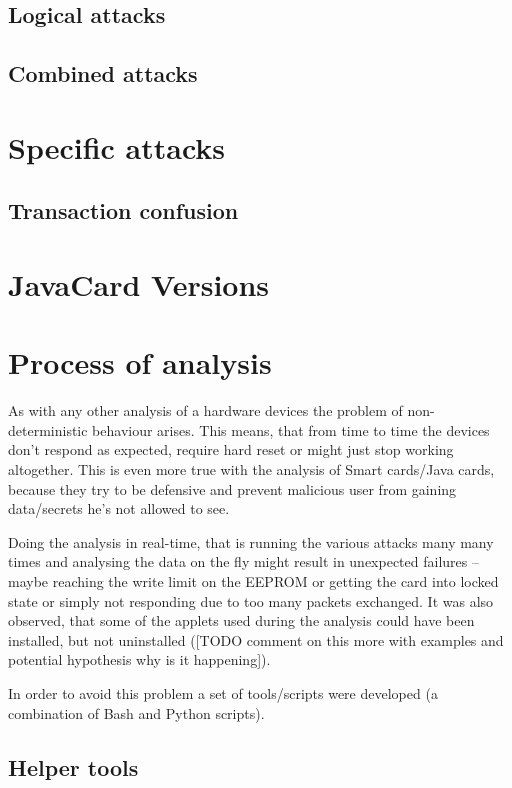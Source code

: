 \documentclass[a4paper]{scrartcl}
\begin{document}
\subsection{Logical attacks}
\subsection{Combined attacks}

\section{Specific attacks}

\subsection{Transaction confusion}


\section{JavaCard Versions}

\section{Process of analysis}

As with any other analysis of a hardware devices the problem of non-deterministic behaviour arises. This means, that from time to time the devices don't respond as expected, require hard reset or might just stop working altogether. This is even more true with the analysis of Smart cards/Java cards, because they try to be defensive and prevent malicious user from gaining data/secrets he's not allowed to see.

Doing the analysis in real-time, that is running the various attacks many many times and analysing the data on the fly might result in unexpected failures -- maybe reaching the write limit on the EEPROM or getting the card into locked state or simply not responding due to too many packets exchanged. It was also observed, that some of the applets used during the analysis could have been installed, but not uninstalled ([TODO comment on this more with examples and potential hypothesis why is it happening]).

In order to avoid this problem a set of tools/scripts were developed (a combination of Bash and Python scripts).

\subsection{Helper tools}
\end{document}
